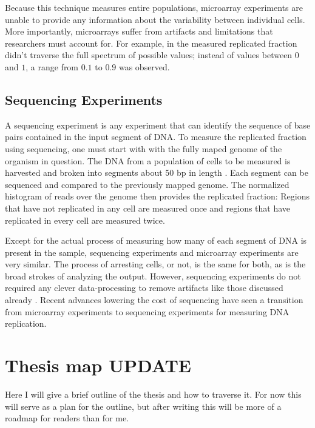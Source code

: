 		Because this technique measures entire populations, microarray experiments are unable to provide any information about the variability between individual cells.
		More importantly, microarrays suffer from artifacts and limitations that researchers must account for.
		For example, in \cite{McCuneMicroArray} the measured replicated fraction didn't traverse the full spectrum of possible values; instead of values between $0$ and $1$, a range from $0.1$ to $0.9$ was observed.
		
		\subsection{Sequencing Experiments}
		
		A sequencing experiment is any experiment that can identify the sequence of base pairs contained in the input segment of DNA.
		To measure the replicated fraction using sequencing, one must start with with the fully maped genome of the organism in question.
		The DNA from a population of cells to be measured is harvested and broken into segments about 50 bp in length \cite{StochasticTermination}.
		Each segment can be sequenced and compared to the previously mapped genome.
		The normalized histogram of reads over the genome then provides the replicated fraction:
		Regions that have not replicated in any cell are measured once and regions that have replicated in every cell are measured twice.
		
		Except for the actual process of measuring how many of each segment of DNA is present in the sample, sequencing experiments and microarray experiments are very similar.
		The process of arresting cells, or not, is the same for both, as is the broad strokes of analyzing the output.
		However, sequencing experiments do not required any clever data-processing to remove artifacts like those discussed already \cite{EndOfMicroarray}.
		Recent advances lowering the cost of sequencing have seen a transition from microarray experiments to sequencing experiments for measuring DNA replication.
		
	\section{Thesis map \textbf{UPDATE}}

	Here I will give a brief outline of the thesis and how to traverse it. For now this will serve as a plan for the outline, but after writing this will be more of a roadmap for readers than for me.
	
